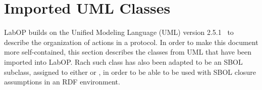 \section{Imported UML Classes}

LabOP builds on the Unified Modeling Language (UML) version 2.5.1~\citep{uml251} to describe the organization of actions in a protocol.
In order to make this document more self-contained, this section describes the classes from UML that have been imported into LabOP.
Rach such class has also been adapted to be an SBOL subclass, assigned to either  or , in order to be able to be used with SBOL closure assumptions in an RDF environment.



